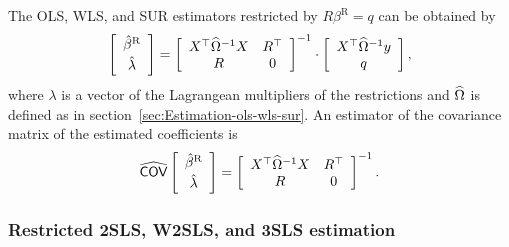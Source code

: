 The OLS, WLS, and SUR estimators restricted by $R \beta^\text{R} = q$ can be obtained by
\begin{equation}
   \left[ \begin{array}{c}
      \hat{\beta}^\text{R} \\[0.2em] \hat{\lambda}
   \end{array} \right]
   =
   \left[ \begin{array}{cc}
      X^\top \widehat{\Omega}^{-1} X & R^\top \\
      R & 0
   \end{array} \right]^{-1}
   \cdot
   \left[ \begin{array}{c}
      X^\top \widehat{\Omega}^{-1} y \\ q
   \end{array} \right] ,
   \label{eq:ols-wls-sur-r}
\end{equation}
where $\lambda$ is a vector of the Lagrangean multipliers of the restrictions
and $\widehat{\Omega}$ is defined as in section~\ref{sec:Estimation-ols-wls-sur}.
An estimator of the covariance matrix of the estimated coefficients is
\begin{equation}
   \widehat{\mathsf{COV}}
   \left[ \begin{array}{c}
      \hat{\beta}^\text{R} \\[0.2em] \hat{\lambda}
   \end{array} \right] 
   = 
   \left[ \begin{array}{cc}
      X^\top \widehat{\Omega}^{-1} X & R^\top \\
      R & 0
   \end{array} \right]^{-1} .
   \label{eq:cov-ols-wls-sur-r}
\end{equation}

\subsubsection{Restricted 2SLS, W2SLS, and 3SLS estimation}

